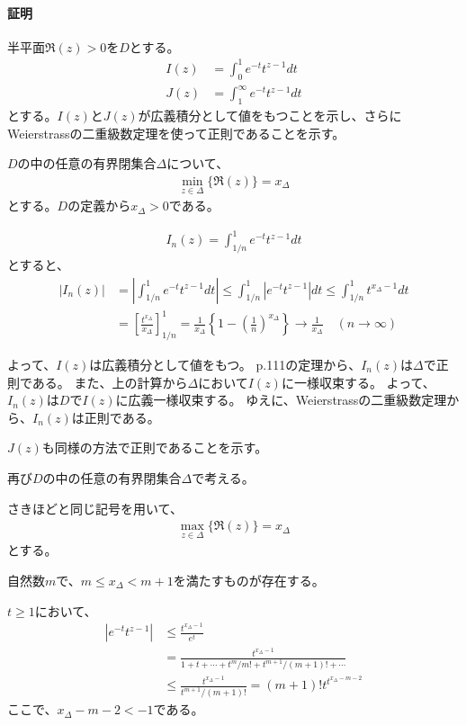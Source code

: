 \paragraph{証明}
半平面$\Re(z)>0$を$D$とする。
\begin{align*}
    I(z)&=\int_{0}^{1}e^{-t}t^{z-1}dt\\
    J(z)&=\int_{1}^{\infty}e^{-t}t^{z-1}dt
\end{align*}
とする。$I(z)$と$J(z)$が広義積分として値をもつことを示し、さらにWeierstrassの二重級数定理を使って正則であることを示す。

$D$の中の任意の有界閉集合$\Delta$について、
\begin{align*}
    \min_{z\in\Delta}\{\Re(z)\}=x_\Delta
\end{align*}
とする。$D$の定義から$x_\Delta>0$である。

\begin{align*}
    I_n(z)=\int_{1/n}^{1}e^{-t}t^{z-1}dt
\end{align*}
とすると、
\begin{align*}
    |I_n(z)|&=\left|\int_{1/n}^{1}e^{-t}t^{z-1}dt\right|
    \le\int_{1/n}^{1}|e^{-t}t^{z-1}|dt
    \le\int_{1/n}^{1}t^{x_\Delta-1}dt\\
    &=\left[\frac{t^{x_\Delta}}{x_\Delta}\right]_{1/n}^1
    =\frac{1}{x_\Delta}\left\{1-\left(\frac{1}{n}\right)^{x_\Delta}\right\}
    \longrightarrow\frac{1}{x_\Delta}\quad(n\longrightarrow\infty)
\end{align*}

よって、$I(z)$は広義積分として値をもつ。
p.111の定理から、$I_n(z)$は$\Delta$で正則である。
また、上の計算から$\Delta$において$I(z)$に一様収束する。
よって、$I_n(z)$は$D$で$I(z)$に広義一様収束する。
ゆえに、Weierstrassの二重級数定理から、$I_n(z)$は正則である。

$J(z)$も同様の方法で正則であることを示す。

再び$D$の中の任意の有界閉集合$\Delta$で考える。

さきほどと同じ記号を用いて、
\begin{align*}
    \max_{z\in\Delta}\{\Re(z)\}=x_\Delta
\end{align*}
とする。

自然数$m$で、$m\le x_\Delta<m+1$を満たすものが存在する。

$t\ge1$において、
\begin{align*}
    |e^{-t}t^{z-1}|&\le\frac{t^{x_\Delta-1}}{e^t}\\
    &=\frac{t^{x_\Delta-1}}{1+t+\cdots+t^m/m!+t^{m+1}/(m+1)!+\cdots}\\
    &\le\frac{t^{x_\Delta-1}}{t^{m+1}/(m+1)!}
    =(m+1)!t^{t^{x_\Delta-m-2}}
\end{align*}
ここで、$x_\Delta-m-2<-1$である。

